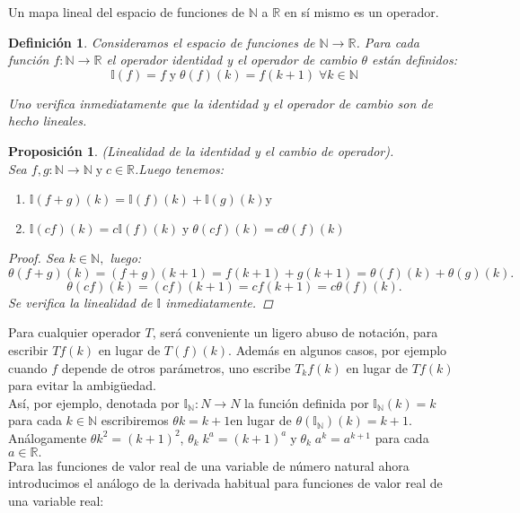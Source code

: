 \documentclass[a4,paper]{article}
\newtheorem{defi}{Definición}[section]
\newtheorem{prop}{Proposición}[section]
\begin{document}
	Un mapa lineal del espacio de funciones de $ \mathbb{N} $ a $ \mathbb{R} $ en sí mismo es un operador.
	\begin{defi}
		Consideramos el espacio de funciones de $ \mathbb{N} \to \mathbb{R} $. Para cada función $ f:\mathbb{N} \to \mathbb{R} $ el operador identidad y el operador de cambio $ \theta $
 están definidos: 
 $$
	\mathbb{I}(f)=f \; \text{y} \; \theta(f)(k)=f(k+1) \; \forall k \in \mathbb{N}
 $$
 
 Uno verifica inmediatamente que la identidad y el operador de cambio son de hecho lineales.
	\end{defi}
\begin{prop}
	(Linealidad de la identidad y el cambio de operador).\\
	Sea $ f,g:\mathbb{N} \to \mathbb{N} \; \text{y} \; c \in \mathbb{R}$.Luego tenemos:
	\begin{enumerate}
		\item $ \mathbb{I}(f+g)(k) = \mathbb{I}(f)(k)+ \mathbb{I}(g)(k) \text{y} $
		\item $ \mathbb{I}(cf)(k)=c\mathbb{I}(f)(k) \; \text{y} \; \theta(cf)(k)=c\theta(f)(k) $
	\end{enumerate}
	\begin{proof}
		Sea $ k \in \mathbb{N},$ luego:
		$$
		\theta(f+g)(k)=(f+g)(k+1)=f(k+1)+g(k+1)=\theta(f)(k)+\theta(g)(k).
		$$
		$$
		\theta(cf)(k)=(cf)(k+1)=cf(k+1)=c\theta(f)(k).
		$$
		Se verifica la linealidad de $ \mathbb{I} $ inmediatamente.
	\end{proof}
\end{prop}
Para cualquier operador $ T $, será conveniente un ligero abuso de notación,
para escribir $ T f (k)$ en lugar de $T (f) (k)$. Además en algunos casos, por ejemplo cuando $f$
depende de otros parámetros, uno escribe $T_{k} f (k)$ en lugar de $T f (k)$ para evitar la ambigüedad.\\
Así, por ejemplo, denotada por $\mathbb{I}_{\mathbb{N}}: N \to N$ la función definida por $\mathbb{I}_{\mathbb{N}} (k) = k$ para cada $ k \in \mathbb{N} $ escribiremos $\theta k = k + 1 $en lugar de $\theta (\mathbb{I}_{\mathbb{N}}) (k) = k + 1.$ Análogamente $\theta k^{2} = (k + 1)^{2}$, $\theta_{k} \; k^{a} = (k + 1)^{a} \; \text{y} \; \theta_{k} \; a^{k} = a^{k+1}$ para cada $ a \in \mathbb{R}. $\\
Para las funciones de valor real de una variable de número natural ahora introducimos el
análogo de la derivada habitual para funciones de valor real de una variable real:
\end{document}
